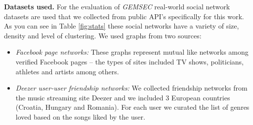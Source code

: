 \textbf{Datasets used.} For the evaluation of \textit{GEMSEC} real-world social network datasets are used that we collected from public API's specifically for this work. As you can see in Table \ref{fig:stats} these social networks have a variety of size, density and level of clustering. We used graphs from two sources:
	\begin{itemize}
		\item \textit{Facebook page networks:} These graphs represent mutual like networks among verified Facebook pages -- the types of sites included TV shows, politicians, athletes and artists among others.
		\item \textit{Deezer user-user friendship networks:} We collected friendship networks from the music streaming site Deezer and we included 3 European countries (Croatia, Hungary and Romania). For each user we curated the list of genres loved based on the songs liked by the user.
	\end{itemize}
